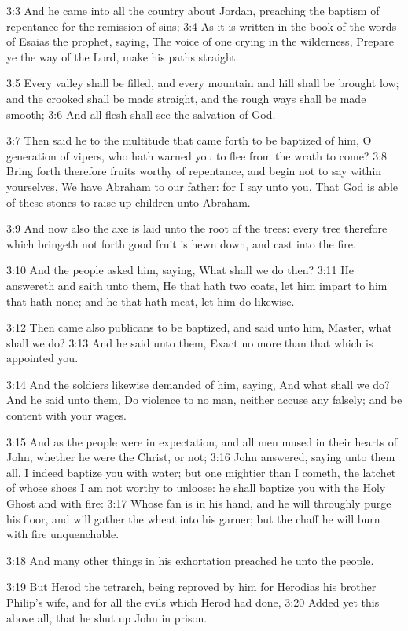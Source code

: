 3:3 And he came into all the country about Jordan, preaching the
baptism of repentance for the remission of sins; 3:4 As it is written
in the book of the words of Esaias the prophet, saying, The voice of
one crying in the wilderness, Prepare ye the way of the Lord, make his
paths straight.

3:5 Every valley shall be filled, and every mountain and hill shall be
brought low; and the crooked shall be made straight, and the rough
ways shall be made smooth; 3:6 And all flesh shall see the salvation
of God.

3:7 Then said he to the multitude that came forth to be baptized of
him, O generation of vipers, who hath warned you to flee from the
wrath to come?  3:8 Bring forth therefore fruits worthy of repentance,
and begin not to say within yourselves, We have Abraham to our father:
for I say unto you, That God is able of these stones to raise up
children unto Abraham.

3:9 And now also the axe is laid unto the root of the trees: every
tree therefore which bringeth not forth good fruit is hewn down, and
cast into the fire.

3:10 And the people asked him, saying, What shall we do then?  3:11 He
answereth and saith unto them, He that hath two coats, let him impart
to him that hath none; and he that hath meat, let him do likewise.

3:12 Then came also publicans to be baptized, and said unto him,
Master, what shall we do?  3:13 And he said unto them, Exact no more
than that which is appointed you.

3:14 And the soldiers likewise demanded of him, saying, And what shall
we do? And he said unto them, Do violence to no man, neither accuse
any falsely; and be content with your wages.

3:15 And as the people were in expectation, and all men mused in their
hearts of John, whether he were the Christ, or not; 3:16 John
answered, saying unto them all, I indeed baptize you with water; but
one mightier than I cometh, the latchet of whose shoes I am not worthy
to unloose: he shall baptize you with the Holy Ghost and with fire:
3:17 Whose fan is in his hand, and he will throughly purge his floor,
and will gather the wheat into his garner; but the chaff he will burn
with fire unquenchable.

3:18 And many other things in his exhortation preached he unto the
people.

3:19 But Herod the tetrarch, being reproved by him for Herodias his
brother Philip's wife, and for all the evils which Herod had done,
3:20 Added yet this above all, that he shut up John in prison.

